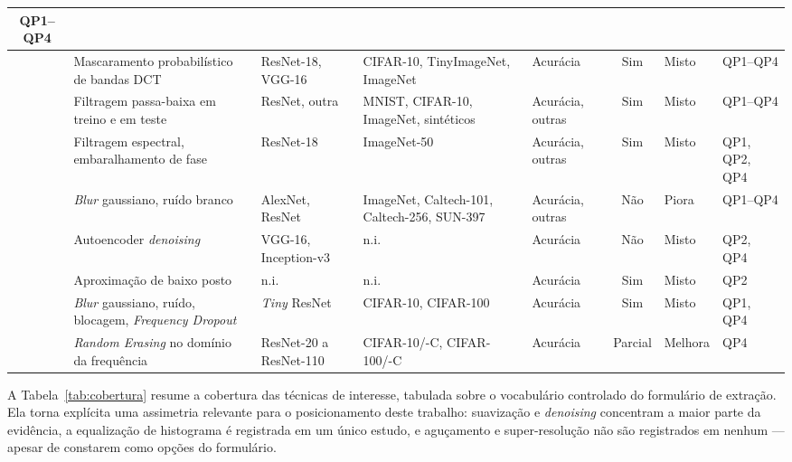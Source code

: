 \documentclass[conference]{IEEEtran}
\begin{document}
\begin{table}[htbp]
\begin{center}
\begin{tabular}{|c|p{3.1cm}|p{2.7cm}|p{3.1cm}|p{1.7cm}|c|p{1.4cm}|p{1.3cm}|}
QP1--QP4 \\
\hline
\cite{b22} & Mascaramento probabilístico de bandas DCT & ResNet-18, VGG-16 &
CIFAR-10, TinyImageNet, ImageNet & Acurácia & Sim & Misto & QP1--QP4 \\
\hline
\cite{b23} & Filtragem passa-baixa em treino e em teste & ResNet, outra &
MNIST, CIFAR-10, ImageNet, sintéticos & Acurácia, outras & Sim & Misto &
QP1--QP4 \\
\hline
\cite{b24} & Filtragem espectral, embaralhamento de fase & ResNet-18 &
ImageNet-50 & Acurácia, outras & Sim & Misto & QP1, QP2, QP4 \\
\hline
\cite{b25} & \textit{Blur} gaussiano, ruído branco & AlexNet, ResNet & ImageNet,
Caltech-101, Caltech-256, SUN-397 & Acurácia, outras & Não & Piora &
QP1--QP4 \\
\hline
\cite{b26} & Autoencoder \textit{denoising} & VGG-16, Inception-v3 & n.i. &
Acurácia & Não & Misto & QP2, QP4 \\
\hline
\cite{b27} & Aproximação de baixo posto & n.i. & n.i. & Acurácia & Sim &
Misto & QP2 \\
\hline
\cite{b28} & \textit{Blur} gaussiano, ruído, blocagem, \textit{Frequency Dropout} &
\textit{Tiny} ResNet & CIFAR-10, CIFAR-100 & Acurácia & Sim & Misto & QP1,
QP4 \\
\hline
\cite{b29} & \textit{Random Erasing} no domínio da frequência & ResNet-20 a
ResNet-110 & CIFAR-10/-C, CIFAR-100/-C & Acurácia & Parcial & Melhora & QP4 \\
\hline
\end{tabular}
\label{tab:caracterizacao}
\end{center}
\end{table}

A Tabela~\ref{tab:cobertura} resume a cobertura das técnicas de interesse,
tabulada sobre o vocabulário controlado do formulário de extração. Ela torna
explícita uma assimetria relevante para o posicionamento deste trabalho:
suavização e \textit{denoising} concentram a maior parte da evidência, a
equalização de histograma é registrada em um único estudo, e aguçamento e
super-resolução não são registrados em nenhum --- apesar de constarem como
opções do formulário.
\end{document}
